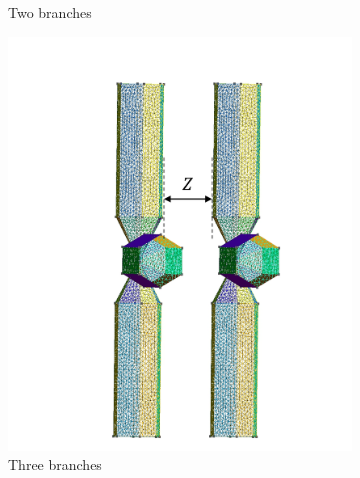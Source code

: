 \begin{figure}[H]
\begin{subfigure}{0.3\linewidth}
        \caption{Two branches}
        \end{subfigure}
        \begin{subfigure}{0.3\linewidth}
            \centering
            \includegraphics[scale = 0.4]{figures/3branches}
            \caption{Three branches}
            \end{subfigure}
            \begin{subfigure}{0.3\linewidth}
                \centering

\end{subfigure}
\end{figure}

